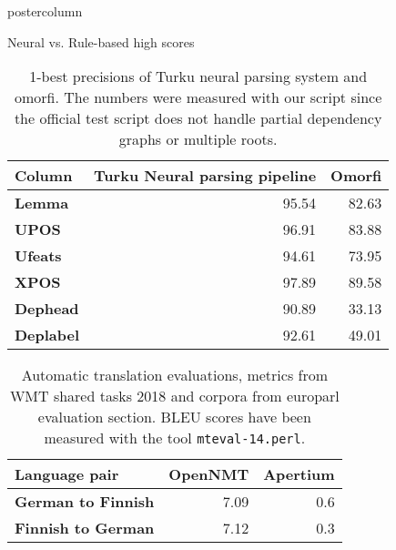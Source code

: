 \documentclass[final,hyperref={pdfpagelabels}]{beamer}
\begin{document}
\begin{frame}
\begin{columns}
\begin{column}{.49\textwidth}
\begin{beamercolorbox}[center,wd=\textwidth]{postercolumn}
\begin{minipage}[T]{.95\textwidth}
{\begin{block}{Neural vs. Rule-based high scores}
\begin{table}
\begin{centering}
\begin{tabular}{lrr}
        \toprule
    Column & \bf Turku Neural parsing pipeline & \bf Omorfi \\
        \midrule
        \bf Lemma & 95.54 & 82.63 \\
        \bf UPOS & 96.91 & 83.88 \\
        \bf Ufeats & 94.61 & 73.95\\
        \bf XPOS & 97.89 & 89.58 \\
        \bf Dephead & 90.89 & 33.13 \\
        \bf Deplabel & 92.61 & 49.01 \\
        \bottomrule
    \end{tabular}
    \caption{1-best precisions of Turku neural parsing system and
    omorfi. The numbers were measured with our script since the official
    test script does not handle partial dependency graphs or multiple roots.
\label{table:eval-ud}}
\end{centering}
\end{table}
\begin{table}
\begin{centering}
    \begin{tabular}{lrr}
        \toprule
    Language pair & \bf OpenNMT & \bf Apertium \\
        \midrule
        \bf German to Finnish & 7.09 & 0.6 \\
        \bf Finnish to German & 7.12 & 0.3  \\
        \bottomrule
    \end{tabular}
    \caption{Automatic translation evaluations, metrics from WMT shared
    tasks 2018 and corpora from europarl evaluation section. BLEU scores have
    been measured with the tool \texttt{mteval-14.perl}.
\label{table:eval-wmt}}
\end{centering}
\end{table}

        \end{block}
         }
        \end{minipage}
      \end{beamercolorbox}
    \end{column}
  \end{columns}

  \end{frame}
\end{document}
